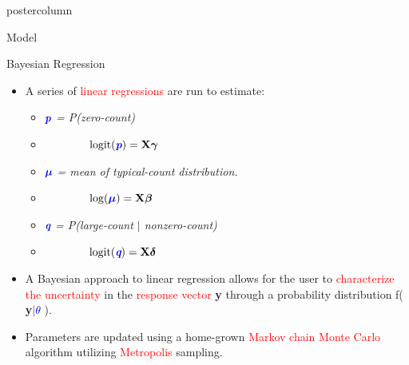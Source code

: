 \documentclass[final]{beamer}\usepackage[]{graphicx}\usepackage[]{color}
\newcommand{\bbeta}{\mbox{\boldmath $\beta$} }
\newcommand{\bdelta}{\mbox{\boldmath $\delta$} }
\newcommand{\bgamma}{\mbox{\boldmath $\gamma$} }
\newcommand{\bmu}{\mbox{\boldmath $\mu$} }
\newcommand{\btheta}{\mbox{\boldmath $\theta$} }
\newcommand{\bfX}{\mbox{\bf X} }
\providecommand{\itbf}[1]{\textit{\textbf{#1}}}
\DeclareMathOperator{\logit}{logit}
\newcommand{\red}{\textcolor{red}}
\newcommand{\blue}{\textcolor{blue}}
\begin{document}
{\begin{frame}
\begin{columns}
\begin{column}{.33\textwidth}
\begin{beamercolorbox}[center,wd=\textwidth]{postercolumn}
\begin{minipage}[T]{.97\textwidth}
{\begin{block}{Model}
	
	
\end{block}
\vfill

\begin{block}{Bayesian Regression}
	
	
	\begin{itemize}
		

		\item A series of \red{linear regressions} are run to estimate:
		
		\begin{itemize}
			\item[] {$\blue{\itbf{p}}$ \it = \textsf{P}(zero-count)}
			\item[] $\qquad\qquad \logit(\blue{\itbf{p}}) = \bfX\bgamma$
			\item[] {$\blue{\bmu}$ \it = mean of typical-count distribution.}
			\item[] $\qquad\qquad\log(\blue{\bmu}) = \bfX\bbeta$
			\item[] {$\blue{\itbf{q}}$ \it = P(large-count $|$ nonzero-count)}
			\item[] $\qquad\qquad\logit(\blue{\itbf{q}}) = \bfX\bdelta$
			\end{itemize}

		\item A Bayesian approach to linear regression allows for the user to \red{characterize the uncertainty} in the \red{response vector} \textbf{y} through a probability distribution f( \textbf{y}$|$\blue{\btheta}).
		\item Parameters are updated using a home-grown \red{Markov chain Monte Carlo} algorithm utilizing \red{Metropolis} sampling. 
	\end{itemize}
	

\end{block}
\vfill

}
\end{minipage}
\end{beamercolorbox}
\end{column}
\end{columns}
\end{frame}}
\end{document}
